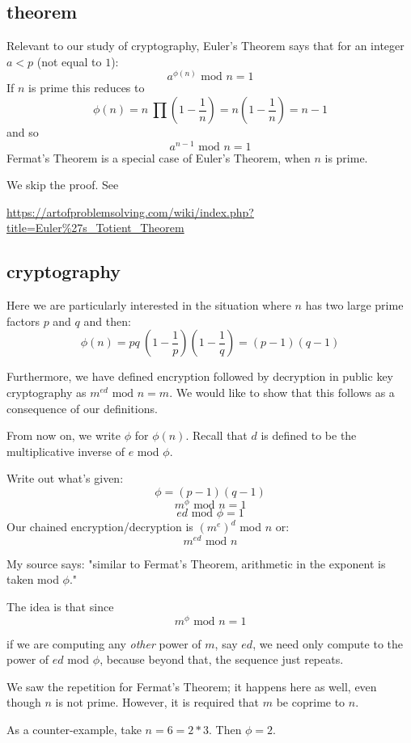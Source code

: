 \documentclass[11pt, oneside]{article}
\begin{document}
\subsection*{theorem}
Relevant to our study of cryptography, Euler's Theorem says that for an integer $a < p$ (not equal to $1$):
\[ a^{\phi(n)} \text{ mod } n = 1 \]
If $n$ is prime this reduces to 
\[ \phi(n) = n \ \prod (1 - \frac{1}{n}) =  n(1 -  \frac{1}{n}) = n - 1 \]
and so
\[ a^{n-1} \text{ mod } n = 1 \]
Fermat's Theorem is a special case of Euler's Theorem, when $n$ is prime.

We skip the proof.  See

\small
\url{https://artofproblemsolving.com/wiki/index.php?title=Euler%27s_Totient_Theorem}
\Large

\subsection*{cryptography}
Here we are particularly interested in the situation where $n$ has two large prime factors $p$ and $q$ and then:
\[ \phi(n) = pq \ (1 - \frac{1}{p}) (1 - \frac{1}{q}) = (p - 1)(q - 1)  \]

Furthermore, we have defined encryption followed by decryption in public key cryptography as $m^{ed} \text{ mod } n = m$.  We would like to show that this follows as a consequence of our definitions.  

From now on, we write $\phi$ for $\phi(n)$.  Recall that $d$ is defined to be the multiplicative inverse of $e$ mod $\phi$. 

Write out what's given:
\[ \phi = (p - 1)(q - 1) \]
\[ m^{\phi} \text{ mod } n = 1 \]
\[ ed  \text{ mod } \phi = 1 \]
Our chained encryption/decryption is $(m^{e})^{d}$ mod $n$  or:
\[ m^{ed} \text{ mod } n \]

My source says:  "similar to Fermat's Theorem, arithmetic in the exponent is taken mod $\phi$."  

The idea is that since  
\[ m^{\phi} \text{ mod } n = 1 \]

if we are computing any \emph{other} power of $m$, say $ed$, we need only compute to the power of $ed$ mod $\phi$, because beyond that, the sequence just repeats.

We saw the repetition for Fermat's Theorem;  it happens here as well, even though $n$ is not prime.  However, it is required that $m$ be coprime to $n$.  

As a counter-example, take $n = 6 = 2*3$.  Then $\phi = 2$.  
\end{document}
